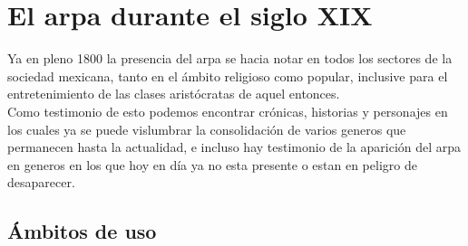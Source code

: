 \section{El arpa durante el siglo XIX}

Ya en pleno 1800 la presencia del arpa se hacia notar en todos los sectores de la sociedad mexicana, tanto en el ámbito religioso como popular, inclusive para el entretenimiento de las clases aristócratas de aquel entonces. \\ Como testimonio de esto podemos encontrar crónicas, historias y personajes en los cuales ya se puede vislumbrar la consolidación de varios generos que permanecen hasta la actualidad, e incluso hay testimonio de la aparición del arpa en generos en los que hoy en día ya no esta presente o estan en peligro de desaparecer.

\subsection{Ámbitos de uso}


